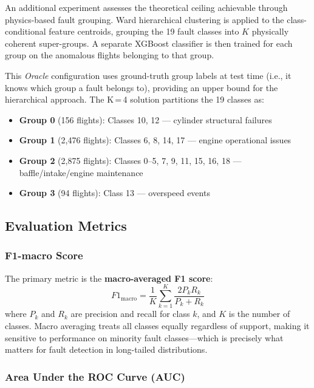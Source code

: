 An additional experiment assesses the theoretical ceiling achievable through
physics-based fault grouping. Ward hierarchical clustering is applied to the
class-conditional feature centroids, grouping the 19 fault classes into $K$
physically coherent super-groups. A separate XGBoost classifier is then trained
for each group on the anomalous flights belonging to that group.

This \textit{Oracle} configuration uses ground-truth group labels at test time
(i.e., it knows which group a fault belongs to), providing an upper bound for
the hierarchical approach. The K\,=\,4 solution partitions the 19 classes as:

\begin{itemize}
    \item \textbf{Group 0} (156 flights): Classes 10, 12 --- cylinder structural failures
    \item \textbf{Group 1} (2{,}476 flights): Classes 6, 8, 14, 17 --- engine operational issues
    \item \textbf{Group 2} (2{,}875 flights): Classes 0--5, 7, 9, 11, 15, 16, 18 --- baffle/intake/engine maintenance
    \item \textbf{Group 3} (94 flights): Class 13 --- overspeed events
\end{itemize}

\subsection{Evaluation Metrics}
\label{subsec:metrics}

\subsubsection{F1-macro Score}

The primary metric is the \textbf{macro-averaged F1 score}:
\begin{equation}
    F1_{\text{macro}} = \frac{1}{K}\sum_{k=1}^{K} \frac{2 P_k R_k}{P_k + R_k}
\end{equation}
where $P_k$ and $R_k$ are precision and recall for class $k$, and $K$ is the
number of classes. Macro averaging treats all classes equally regardless of
support, making it sensitive to performance on minority fault classes---which
is precisely what matters for fault detection in long-tailed distributions.

\subsubsection{Area Under the ROC Curve (AUC)}

